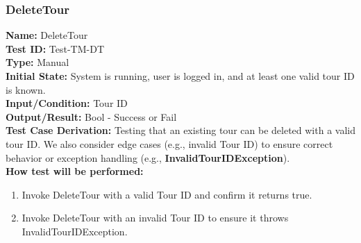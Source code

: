 \documentclass[12pt, titlepage]{article}
\begin{document}
\subsubsection{DeleteTour}
\textbf{Name:} DeleteTour \label{itm:Test-TM-DT} \\
\textbf{Test ID:} Test-TM-DT \\
\textbf{Type:} Manual \\
\textbf{Initial State:} System is running, user is logged in, and at least one valid tour ID is known. \\
\textbf{Input/Condition:} Tour ID \\
\textbf{Output/Result:} Bool - Success or Fail \\
\textbf{Test Case Derivation:} Testing that an existing tour can be deleted with a valid tour ID. We also consider edge cases (e.g., invalid Tour ID) to ensure correct behavior or exception handling (e.g., \textbf{InvalidTourIDException}).\\
\textbf{How test will be performed:}
\begin{enumerate}
    \item Invoke DeleteTour with a valid Tour ID and confirm it returns true.
    \item Invoke DeleteTour with an invalid Tour ID to ensure it throws InvalidTourIDException.
\end{enumerate}
\end{document}
